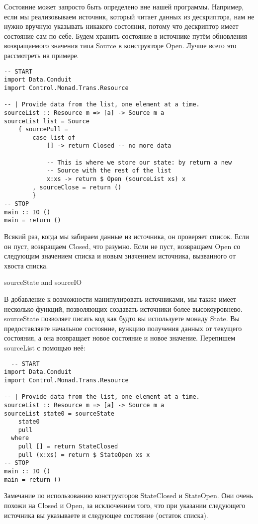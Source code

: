 Состояние может запросто быть определено вне нашей программы. Например, если мы
реализовываем источник, который читает данных из дескриптора, нам не нужно вручную
указывать никакого состояния, потому что дескриптор имеет состояние сам по себе.
Будем хранить состояние в источнике путём обновления возвращаемого значения типа Source в
конструкторе Open. Лучше всего это рассмотреть на примере.

\begin{lstlisting}
-- START
import Data.Conduit
import Control.Monad.Trans.Resource

-- | Provide data from the list, one element at a time.
sourceList :: Resource m => [a] -> Source m a
sourceList list = Source
    { sourcePull =
        case list of
            [] -> return Closed -- no more data

            -- This is where we store our state: by return a new
            -- Source with the rest of the list
            x:xs -> return $ Open (sourceList xs) x
        , sourceClose = return ()
        }
-- STOP
main :: IO ()
main = return ()
\end{lstlisting}

Всякий раз, когда мы забираем данные из источника, он проверяет список. Если он пуст,
возвращаем Closed, что разумно. Если не пуст, возвращаем Open со следующим значением
списка и новым значением источника, вызванного от хвоста списка.

sourceState and sourceIO

В добавление к возможности манипулировать источниками, мы также имеет несколько функций,
позволяющих создавать источники более высокоуровнево. sourceState позволяет писать
код как будто вы используете монаду State. Вы предоставляете начальное состояние,
вункцию получения данных от текущего состояния, а она возвращает новое состояние и
новое значение. Перепишем sourceList с помощью неё:

\begin{lstlisting}
  -- START
import Data.Conduit
import Control.Monad.Trans.Resource

-- | Provide data from the list, one element at a time.
sourceList :: Resource m => [a] -> Source m a
sourceList state0 = sourceState
    state0
    pull
  where
    pull [] = return StateClosed
    pull (x:xs) = return $ StateOpen xs x
-- STOP
main :: IO ()
main = return ()
\end{lstlisting}

Замечание по использованию конструкторов StateClosed и StateOpen. Они очень похожи на
Closed и Open, за исключением того, что при указании следующего источника вы указываете и
следующее состояние (остаток списка).

